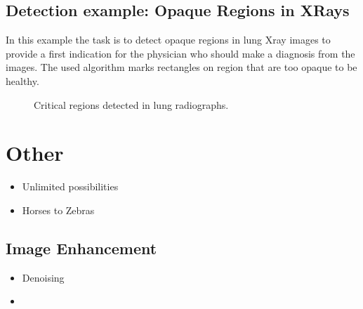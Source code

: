 \documentclass[letterpaper,10pt,english]{sphinxmanual}
\begin{document}
\subsection{Detection example: Opaque Regions in X\sphinxhyphen{}Rays}
\label{\detokenize{03-Datasets:detection-example-opaque-regions-in-x-rays}}
\sphinxAtStartPar
In this example the task is to detect opaque regions in lung X\sphinxhyphen{}ray images to provide a first indication for the physician who should make a diagnosis from the images. The used algorithm marks rectangles on region that are too opaque to be healthy.

\begin{figure}[htbp]
\centering
\capstart

\noindent{}
\caption{Critical regions detected in lung radiographs.}\label{\detokenize{03-Datasets:id16}}\end{figure}



\sphinxAtStartPar
{}


\section{Other}
\label{\detokenize{03-Datasets:other}}\begin{itemize}
\item {} 
\sphinxAtStartPar
Unlimited possibilities 

\item {} 
\sphinxAtStartPar
Horses to Zebras

\end{itemize}


\subsection{Image Enhancement}
\label{\detokenize{03-Datasets:image-enhancement}}\begin{itemize}
\item {} 
\sphinxAtStartPar
Denoising 

\item {} 
\sphinxAtStartPar
{}

\end{itemize}
\end{document}
